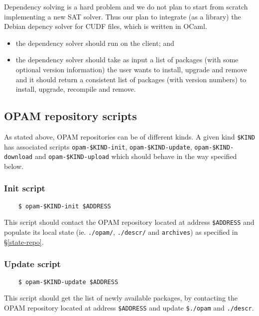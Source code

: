 \documentclass[a4paper,11pt]{article}
\begin{document}
Dependency solving is a hard problem and we do not plan to start from
scratch implementing a new SAT solver. Thus our plan to integrate (as
a library) the Debian depency solver for CUDF files, which is written
in OCaml.

\begin{itemize}
\item the dependency solver should run on the client; and
\item the dependency solver should take as input a list of packages
  (with some optional version information) the user wants to install,
  upgrade and remove and it should return a consistent list of
  packages (with version numbers) to install, upgrade, recompile and
  remove.
\end{itemize}

\subsection{OPAM repository scripts}
\label{scripts}

As stated above, OPAM repositories can be of different kinds. A given
kind \verb+$KIND+ has associated scripts \verb+opam-$KIND-init+,
\verb+opam-$KIND-update+, \verb+opam-$KIND-download+ and
\verb+opam-$KIND-upload+ which should behave in the way specified
below.

\subsubsection{Init script}
\label{script-init}

\begin{verbatim}
    $ opam-$KIND-init $ADDRESS
\end{verbatim}

This script should contact the OPAM repository located at address
\verb+$ADDRESS+ and populate its local state (ie. \verb+./opam/+,
\verb+./descr/+ and \verb+archives+) as specified in
\S\ref{state-repo}.

\subsubsection{Update script}
\label{script-update}

\begin{verbatim}
    $ opam-$KIND-update $ADDRESS
\end{verbatim}

This script should get the list of newly available packages, by
contacting the OPAM repository located at address \verb+$ADDRESS+
and update \verb+$./opam+ and \verb+./descr+.
\end{document}
